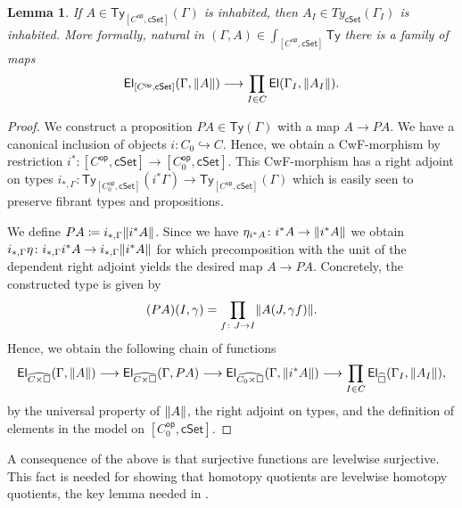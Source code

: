 \documentclass[10pt,a4paper]{article}
\newtheorem{lemma}{Lemma}[section]
\newcommand{\cSet}{\mathsf{cSet}}
\DeclareMathOperator\op{\mathsf{op}}
\newcommand\Ty{\mathsf{Ty}}
\newcommand\El{\mathsf{El}}
\begin{document}
\begin{lemma}\label{prop:psh:levelwise-inhabited-if-inhabited}
  If \(A \in \Ty_{[C^{\op}, \cSet]}(\Gamma)\) is inhabited, then \(A_I \in Ty_{\cSet}(\Gamma_I)\) is inhabited.
  More formally, natural in \((\Gamma, A) \in \int_{[C^{\op}, \cSet]} \Ty\) there is a family of maps
  \[
    \El_{[C^{\op}, \cSet]}(\Gamma, \trunc{A}) \longrightarrow \prod_{I \in C} \El(\Gamma_{I}, \trunc{A_{I}}).
  \]
\end{lemma}
\begin{proof}
  We construct a proposition $PA \in \Ty(\Gamma)$ with a map $A \to PA$.
  We have a canonical inclusion of objects $i \colon C_0 \hookrightarrow C$.
  Hence, we obtain a CwF-morphism by restriction $i^* \colon [C^{\op}, \cSet] \to [C^{\op}_0, \cSet]$.
  This CwF-morphism has a right adjoint on types $i_{*,\Gamma} \colon \Ty_{[C^{\op}_0, \cSet]}(i^*\Gamma) \to \Ty_{[C^{\op}, \cSet]}(\Gamma)$ which is easily seen to preserve fibrant types and propositions.

  We define $PA \coloneqq i_{*,\Gamma}\trunc{i^*A}$.
  Since we have $\eta_{i^*A} \colon i^* A \to \trunc{i^*A}$ we obtain $i_{*,\Gamma}\eta \colon i_{*,\Gamma}i^*A \to i_{*,\Gamma}\trunc{i^*A}$ for which precomposition with the unit of the dependent right adjoint yields the desired map $A \to PA$.
  Concretely, the constructed type is given by
  \[
    (PA)(I, \gamma) = \prod_{f \colon J \to I} \trunc{A(J, \gamma f)}.
  \]
  Hence, we obtain the following chain of functions
  \[
    \El_{\widehat{C \times \square}}(\Gamma, \trunc{A})
    \longrightarrow \El_{\widehat{C \times \square}}(\Gamma, PA)
    \longrightarrow \El_{\widehat{C_0 \times \square}}(\Gamma, \trunc{i^*A})
    \longrightarrow \prod_{I \in C} \El_{\widehat\square}(\Gamma_I, \trunc{A_I}),
  \]
  by the universal property of \(\trunc{A}\), the right adjoint on types, and the definition of elements in the model on \([C_0^{\op}, \cSet]\).
\end{proof}

A consequence of the above is that surjective functions are levelwise surjective.
This fact is needed for showing that homotopy quotients are levelwise homotopy quotients, the key lemma needed in .
\end{document}

